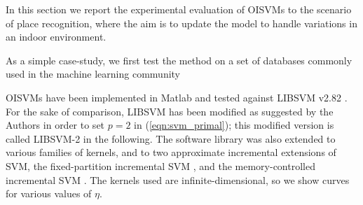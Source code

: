 In this section we report the experimental evaluation of OISVMs
to the scenario of place recognition, where the aim is to update
the model to handle variations in an indoor environment.

As a
simple case-study, we first test the method on a set of databases
commonly used in the machine learning community

OISVMs have been implemented in Matlab and tested against LIBSVM v2.82
\cite{ChangL01}. For the sake of comparison, LIBSVM has been modified
as suggested by the Authors in order to set $p=2$ in
(\ref{eqn:svm_primal}); this modified version is called LIBSVM-2 in
the following.  The software library was also extended to various
families of kernels, and to two approximate incremental extensions of
SVM, the fixed-partition incremental SVM \cite{syed99incremental}, and
the memory-controlled incremental SVM \cite{pronobis:icvs06}.
The kernels used are infinite-dimensional, so we show curves for various
values of $\eta$.



